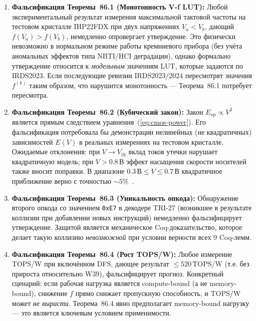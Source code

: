\begin{enumerate}
  \item \textbf{Фальсификация Теоремы~86.1 (Монотонность V-f LUT):}
        Любой экспериментальный результат измерения максимальной
        тактовой частоты на тестовом кристалле IHP22FDX при двух
        напряжениях $V_a < V_b$, дающий $f(V_a) > f(V_b)$, немедленно
        опровергает утверждение.  Это физически невозможно в нормальном
        режиме работы кремниевого прибора (без учёта аномальных эффектов
        типа NBTI/HCI деградации), однако формально утверждение относится
        к \emph{модельным} значениям LUT, которые задаются по IRDS2023.
        Если последующие ревизии IRDS2023/2024 пересмотрят значения
        $f^{(k)}$ таким образом, что нарушится монотонность — Теорема~86.1
        потребует пересмотра.

  \item \textbf{Фальсификация Теоремы~86.2 (Кубический закон):}
        Закон $E_{\mathrm{op}} \propto V^2$ является прямым следствием
        уравнения~(\ref{eq:cmos-power}).  Его фальсификация потребовала бы
        демонстрации нелинейных (не квадратичных) зависимостей $E(V)$
        в реальных измерениях на тестовом кристалле.  Ожидаемые отклонения:
        при $V \to V_{\mathrm{th}}$ вклад токов утечки нарушает квадратичную
        модель; при $V > 0{.}8\,\text{В}$ эффект насыщения скорости носителей
        также вносит поправки.  В диапазоне $0{.}3\,\text{В} \leq V \leq 0{.}7\,\text{В}$
        квадратичное приближение верно с точностью $\sim\!5\%$~\cite{Weste-Harris-CMOS4}.

  \item \textbf{Фальсификация Теоремы~86.3 (Уникальность опкода):}
        Обнаружение второго опкода со значением \texttt{0xE7} в декодере
        TRI-27 (возникшее в результате коллизии при добавлении новых
        инструкций) немедленно фальсифицирует утверждение.  Защитой является
        механическое Coq-доказательство, которое делает такую коллизию
        \emph{невозможной} при условии верности всех 9 Coq-лемм.

  \item \textbf{Фальсификация Теоремы~86.4 (Рост TOPS/W):}
        Любое измерение TOPS/W при включённом DFS, дающее результат
        $\leq 520\,\text{TOPS/W}$ (т.е. без прироста относительно W39),
        фальсифицирует прогноз.  Конкретный сценарий: если рабочая нагрузка
        является compute-bound (а не memory-bound), снижение $f$ прямо
        снижает пропускную способность, и TOPS/W может \emph{не вырасти}.
        Теорема~86.4 явно предполагает memory-bound нагрузку — это является
        ключевым условием применимости.
\end{enumerate}

